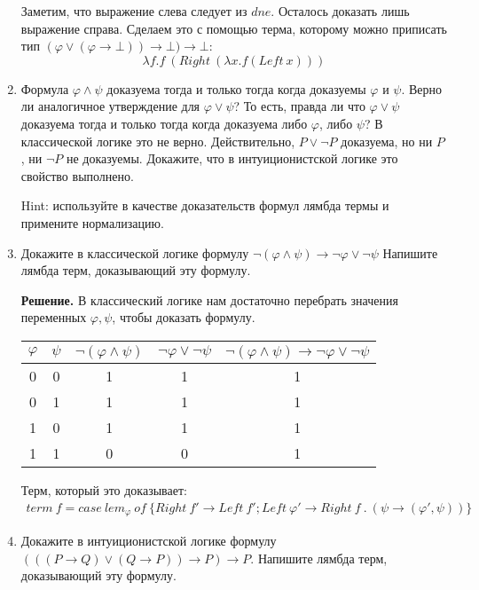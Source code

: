 \begin{enumerate}
	Заметим, что выражение слева следует из $dne$. Осталось доказать лишь выражение справа. Сделаем это с помощью терма, которому можно приписать тип $(\varphi \lor (\varphi \to \bot)) \to \bot) \to \bot$:
	\begin{equation*}
		\lambda f. f \ (Right \ (\lambda x. f (Left \ x))) 
	\end{equation*}

	

\item Формула $\varphi \land \psi$ доказуема тогда и только тогда когда доказуемы $\varphi$ и $\psi$.
    Верно ли аналогичное утверждение для $\varphi \lor \psi$?
    То есть, правда ли что $\varphi \lor \psi$ доказуема тогда и только тогда когда доказуема либо $\varphi$, либо $\psi$?
    В классической логике это не верно.
    Действительно, $P \lor \neg P$ доказуема, но ни $P$, ни $\neg P$ не доказуемы.
    Докажите, что в интуиционистской логике это свойство выполнено.
    
    Hint: используйте в качестве доказательств формул лямбда термы и примените нормализацию.

\item Докажите в классической логике формулу $\neg (\varphi \land \psi) \to \neg \varphi \lor \neg \psi$
    Напишите лямбда терм, доказывающий эту формулу.
    
    \textbf{Решение.}
    В классический логике нам достаточно перебрать значения переменных $\varphi, \psi$, чтобы доказать формулу.
   
   \begin{longtable}{c|c|c|c|c}
   		$\varphi$ & $\psi$ & $\neg(\varphi \land \psi)$ & $\neg \varphi \lor \neg \psi$ & $\neg(\varphi \land \psi) \to \neg \varphi \lor \neg \psi$  \\ \hline
   		0 & 0 & 1 & 1 & 1 \\ 
   		0 & 1 & 1 & 1 & 1 \\ 
   		1 & 0 & 1 & 1 & 1 \\ 
   		1 & 1 & 0 & 0 & 1 \\ 
   	\end{longtable}
   	
   	Терм, который это доказывает:
   	\begin{align*}
	   	term \ f = case \ lem_{\varphi} \ of \ \{Right \ f' \to Left \ f'; Left \ \varphi' \to Right \ f \ . \ (\psi \to (\varphi', \psi))\}
   	\end{align*}

\item Докажите в интуиционистской логике формулу $(((P \to Q) \lor (Q \to P)) \to P) \to P$.
    Напишите лямбда терм, доказывающий эту формулу.


\end{enumerate}
